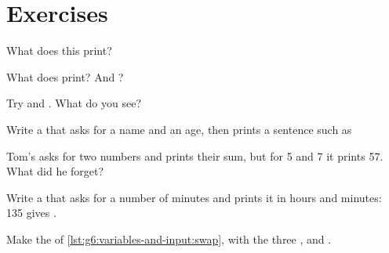 \section{Exercises}

\begin{exercise}[$\star$]\label{exo:g6:variables-and-input:1}
What does this  print?

\label{lst:g6:variables-and-input:three-a}
\end{exercise}

\begin{exercise}[$\star$]\label{exo:g6:variables-and-input:2}
What does  print? And ?
\end{exercise}

\begin{exercise}[$\star$]\label{exo:g6:variables-and-input:3}
Try  and . What do you see?
\end{exercise}

\begin{exercise}[$\star$]\label{exo:g6:variables-and-input:4}
Write a  that asks for a name and an age, then prints a sentence such
as 
\end{exercise}

\begin{exercise}[$\star\star$]\label{exo:g6:variables-and-input:5}
Tom's  asks for two numbers and prints their sum, but for 5 and 7 it
prints 57. What did he forget?
\end{exercise}

\begin{exercise}[$\star\star$]\label{exo:g6:variables-and-input:6}
Write a  that asks for a number of minutes and prints it in hours and
minutes: 135 gives .
\end{exercise}

\begin{exercise}[$\star\star$]\label{exo:g6:variables-and-input:7}
Make the  of \cref{lst:g6:variables-and-input:swap}, with the
three  ,  and .
\end{exercise}

